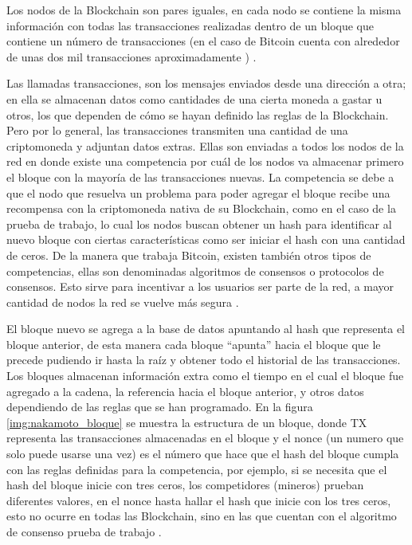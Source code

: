 Los nodos de la  Blockchain son pares iguales, en cada nodo se contiene la misma información con todas las transacciones realizadas
dentro de un bloque que contiene un número de transacciones (en el caso de Bitcoin cuenta con  alrededor de unas dos mil transacciones aproximadamente ) \cite[]{retamal_Blockchain_2017}.

Las llamadas transacciones, son los mensajes enviados desde una dirección a otra;  en ella 
 se almacenan datos como cantidades de una cierta moneda a gastar u otros, los que  dependen 
 de cómo  se hayan definido las reglas de la Blockchain. Pero por lo general, las transacciones transmiten una cantidad de una criptomoneda y adjuntan 
 datos extras. Ellas son enviadas a todos los nodos de la red en donde existe una competencia por cuál de los  nodos va almacenar primero el bloque con la 
 mayoría de las transacciones nuevas. La competencia se debe a que el nodo que resuelva un problema para poder agregar el bloque 
 recibe una recompensa con la criptomoneda nativa de su  Blockchain,  como en el caso de la prueba de trabajo, lo cual los nodos buscan
 obtener un hash para identificar al nuevo bloque  con ciertas características como ser iniciar el hash con una cantidad de ceros. De la manera que trabaja 
 Bitcoin, existen también otros tipos de competencias, ellas son denominadas algoritmos de consensos o protocolos de consensos.
Esto sirve para incentivar a los usuarios ser parte de la red, a mayor cantidad de nodos la red se vuelve más segura \cite[]{retamal_Blockchain_2017,nakamoto_bitcoin_2008,brys_cadena_2019}. 

El bloque nuevo se agrega a la base de datos apuntando al hash que representa el bloque anterior, de esta manera
cada bloque “apunta” hacia el bloque que le precede  pudiendo ir hasta la raíz y obtener todo el historial de las transacciones.
Los bloques almacenan información extra como el tiempo en el cual el bloque fue agregado a la cadena, la referencia hacia el bloque anterior, y otros 
datos dependiendo de las reglas que se han programado.
En la figura \ref{img:nakamoto_bloque}  se muestra la estructura de un bloque, donde  TX representa
las transacciones almacenadas en el bloque y el nonce (un numero que solo puede usarse una vez) es el número que hace que el hash del bloque cumpla con las reglas definidas para 
la competencia, por ejemplo, si se necesita que el hash del bloque inicie con tres ceros, los competidores (mineros) prueban diferentes valores, en el nonce
hasta hallar el hash que inicie con los tres ceros, esto no ocurre en todas las Blockchain, sino en las que cuentan con
el algoritmo de consenso prueba de trabajo \cite[]{drescher_Blockchain_2017,nakamoto_bitcoin_2008,kelly_investigation_2018,ethereum_org_transactions_2021}. 

